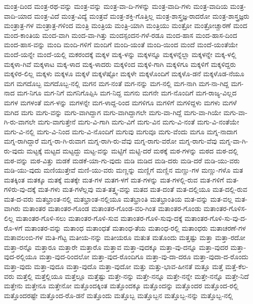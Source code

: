 {ಮಂತ್ರ-ದಿಂದ
ಮಂತ್ರ-ರಥ-ವನ್ನು
ಮಂತ್ರ-ವನ್ನು
ಮಂತ್ರ-ವಾ-ದಿ-ಗಳನ್ನು
ಮಂತ್ರ-ವಾದಿ-ಗಳು
ಮಂತ್ರ-ವಾದಿಯ
ಮಂತ್ರ-ವಾದಿ-ಯಾದ
ಮಂತ್ರ-ವಿದೆ
ಮಂತ್ರ-ವಿದ್ಯೆ
ಮಂತ್ರವೆ
ಮಂತ್ರ-ಶಕ್ತಿ-ಗೊತ್ತಿಲ್ಲ
ಮಂತ್ರ-ಶಾಸ್ತ್ರಜ್ಞ-ರಾದರೋ
ಮಂತ್ರ-ಶಾಸ್ತ್ರಜ್ಞರು
ಮಂತ್ರಾತ್ರ-ಗಳ
ಮಂತ್ರಾತ್ರ-ಗಳಿಂದ
ಮಂತ್ರಿ
ಮಂತ್ರಿಯ
ಮಂತ್ರಿ-ಯಾಗಿ
ಮಂತ್ರಿಯು
ಮಂತ್ರೋ
ಮಂತ್ರೋಚ್ಚಾರಣೆ
ಮಂದ
ಮಂದ-ಕಾಂತಿಯ
ಮಂದ-ವಾಗಿ
ಮಂದ-ವಾ-ಗಿತ್ತು
ಮಂದಸ್ಪಂದನ-ಗಳೆ-ರಡೂ
ಮಂದ-ಹಾಸ
ಮಂದ-ಹಾಸ-ದಿಂದ
ಮಂದ-ಹಾಸ-ವನ್ನು
ಮಂದಿ
ಮಂದಿ-ಗಳಿಗೆ
ಮಂದಿಗೆ
ಮಂದಿ-ಯಂತೆ
ಮಂದಿ-ಯಿಂದ
ಮಂದೆ
ಮಂದೆ-ಯಂತೆಯೇ
ಮಂದೆ-ಯನ್ನೇ
ಮಂದೆ-ಯಲ್ಲಿ
ಮಕರಂದಕ್ಕೆ
ಮಕ್ಕಳ
ಮಕ್ಕ-ಳನ್ನು
ಮಕ್ಕಳನ್ನೂ
ಮಕ್ಕಳನ್ನೆಲ್ಲಾ
ಮಕ್ಕಳನ್ನೇ
ಮಕ್ಕ-ಳಲ್ಲಿ
ಮಕ್ಕಳಾ-ಗಿವೆ
ಮಕ್ಕಳಾಟ
ಮಕ್ಕ-ಳಾದ
ಮಕ್ಕ-ಳಾದರು
ಮಕ್ಕಳಿಂದ
ಮಕ್ಕಳಿ-ಗಾಗಿ
ಮಕ್ಕಳಿಗೂ
ಮಕ್ಕಳಿಗೆ
ಮಕ್ಕಳಿದ್ದರು
ಮಕ್ಕಳಿರ-ಲಿಲ್ಲ
ಮಕ್ಕಳು
ಮಕ್ಕಳೂ
ಮಕ್ಕಳೆ
ಮಕ್ಕಳೆಷ್ಟೋ
ಮಕ್ಕಳೇ
ಮಕ್ಕಳೊಂದಿಗೆ
ಮಕ್ಕಳೊ-ಡನೆ
ಮಕ್ಕಳೊಡ-ನೆಯೂ
ಮಗ
ಮಗದೊಬ್ಬ
ಮಗದೊಬ್ಬ-ನಲ್ಲಿ
ಮಗನ
ಮಗ-ನಂತೆ
ಮಗ-ನನ್ನು
ಮಗ-ನಲ್ಲಿ
ಮಗ-ನಾಗಿ
ಮಗ-ನಾ-ಗಿದ್ದ
ಮಗ-ನಾದ
ಮಗ-ನಿಗೂ
ಮಗ-ನಿಗೆ
ಮಗನಿಗೊಪ್ಪಿಸಿ
ಮಗ-ನಿದ್ದ
ಮಗನು
ಮಗನೇ
ಮಗ-ನೊಂದಿಗೆ
ಮಗ-ರಾಜ್ಯ-ವಿಲ್ಲದ
ಮಗಳ
ಮಗಳಂತೆ
ಮಗ-ಳನ್ನು
ಮಗಳನ್ನೇ
ಮಗ-ಳಾದ್ದ-ರಿಂದ
ಮಗಳಿಗೂ
ಮಗಳಿಗೆ
ಮಗಳಿದ್ದಳು
ಮಗಳು
ಮಗಳೆ
ಮಗಿದ
ಮಗು
ಮಗು-ವನ್ನು
ಮಗು-ವಾಗಿದ್ದಾಗ
ಮಗು-ವಾಗಿದ್ದಾಗಲೇ
ಮಗು-ವಾ-ಗಿದ್ದೆ
ಮಗು-ವಾ-ಗಿಯೇ
ಮಗು-ವಾ-ಗಿ-ರು-ವಾಗಲೇ
ಮಗು-ವಾಗುತ್ತೇನೆ
ಮಗು-ವಿ-ಗಾಗಿ
ಮಗು-ವಿಗೆ
ಮಗು-ವಿನ
ಮಗು-ವಿ-ನಂತೆ
ಮಗು-ವಿ-ನಂತೆಯೇ
ಮಗು-ವಿ-ನಲ್ಲಿ
ಮಗು-ವಿ-ನಿಂದ
ಮಗು-ವಿ-ನೊಂದಿಗೆ
ಮಗುವು
ಮಗುವೂ
ಮಗು-ವೆಂದು
ಮಗೂ
ಮಗ್ನ-ನಾದಾಗ
ಮಗ್ನ-ರಾಗಿದ್ದಾರೆ
ಮಗ್ನ-ರಾ-ಗಿ-ರುವಾಗ
ಮಗ್ನ-ರಾಗಿ-ರು-ವೆವು
ಮಗ್ನ-ರಾಗು-ವರೋ
ಮಗ್ನ-ರಾಗು-ವೆವು
ಮಗ್ನ-ವಾ-ಗಿ-ರು-ವುದು
ಮಟ್ಟಕ್ಕೆ
ಮಟ್ಟದ
ಮಟ್ಟದ್ದು
ಮಟ್ಟ-ವನ್ನು
ಮಟ್ಟಿಗೆ
ಮಟ್ಟಿ-ದರೆ
ಮಠಕ್ಕೆ
ಮಠ-ಗಳನ್ನು
ಮಠದ
ಮಠ-ದಲ್ಲಿ
ಮಠ-ವನ್ನು
ಮಠ-ವಿತ್ತು
ಮಡಕೆ
ಮಡಕೆ-ಯಾ-ಗು-ವುದು
ಮಡಿ
ಮಡಿದ
ಮಡಿ-ದರು
ಮಡಿ-ದರೆ
ಮಡಿ-ಯು-ವರು
ಮಡಿ-ಯು-ವುದು
ಮಣಿಯುತ್ತೇವೆ
ಮಣಿ-ಯು-ವರು
ಮಣ್ಣನ್ನು
ಮಣ್ಣಿಗೆ
ಮಣ್ಣಿನ
ಮಣ್ಣು-ಗಳ
ಮಣ್ಣು-ಗಳೊ
ಮತ
ಮತಕ್ಕಿಂತ
ಮತಕ್ಕೂ
ಮತಕ್ಕೆ
ಮತಕ್ಕೇ
ಮತ-ಗಳ
ಮತಗ-ಳಗೆ
ಮತ-ಗಳನ್ನು
ಮತ-ಗಳಲ್ಲಿ-ರುವ
ಮತ-ಗಳಿಗೆ
ಮತ-ಗಳಿರು-ವು-ದಕ್ಕೆ
ಮತ-ಗಳು
ಮತ-ಗಳೆಲ್ಲವು
ಮತ-ತತ್ತ್ವ-ವನ್ನು
ಮತದ
ಮತ-ದಂತೆ
ಮತ-ದಲ್ಲಿಯೂ
ಮತ-ದಲ್ಲಿ-ರುವ
ಮತ-ದ-ವರು
ಮತಭ್ರಾಂತ-ನಲ್ಲಿ
ಮತಭ್ರಾಂತ-ನಲ್ಲಿಯೂ
ಮತಭ್ರಾಂತಿ
ಮತಭ್ರಾಂತಿಯ
ಮತ-ವನ್ನು
ಮತ-ವಲ್ಲ
ಮತ-ವಾಗಿರು
ಮತಾಂತರ
ಮತಾಂತರ-ಗೊಂಡ
ಮತಾಂತರ-ಗೊಂಡ-ವರಿ-ಗಿಂತ
ಮತಾಂತರ-ಗೊಂಡು
ಮತಾಂತರ-ಗೊಳಿಸ-ಲಿಲ್ಲ
ಮತಾಂತರ-ಗೊಳಿ-ಸಲು
ಮತಾಂತರ-ಗೊಳಿ-ಸುವ
ಮತಾಂತರ-ಗೊಳಿ-ಸುವು-ದಕ್ಕೆ
ಮತಾಂತರ-ಗೊಳಿ-ಸು-ವು-ದ-ರೊ-ಳಗೆ
ಮತಾಂತರ-ವನ್ನು
ಮತಾಂಧ
ಮತಾಂಧತೆ
ಮತಾಂಧ-ತೆಯ
ಮತಾಂಧ-ರಲ್ಲಿ
ಮತಾಂಧರು
ಮತಾಚರಣೆ-ಗಳ
ಮತಾವಲಂಬಿ-ಗಳ
ಮತಿ-ಗೆಟ್ಟ
ಮತೀಯ-ನನ್ನು
ಮತೀಯರೂ
ಮತುತ
ಮತೊಂದು
ಮತ್ತಷ್ಟು
ಮತ್ತಾ
ಮತ್ತಾ-ರದೋ
ಮತ್ತಾ-ರನ್ನೊ
ಮತ್ತಾರೂ
ಮತ್ತಾರೇ
ಮತ್ತಾರೊ
ಮತ್ತಾವ
ಮತ್ತಾ-ವುದಕ್ಕೂ
ಮತ್ತಾ-ವು-ದನ್ನೂ
ಮತ್ತಾ-ವುದರ
ಮತ್ತಾ-ವುದ-ರಲ್ಲಿಯೂ
ಮತ್ತಾ-ವುದ-ರಿಂದಲೋ
ಮತ್ತಾ-ವುದ-ರೊಂದಿಗೂ
ಮತ್ತಾ-ವು-ದಾ-ದರೂ
ಮತ್ತಾ-ವುದಾ-ದ-ರೊಂದು
ಮತ್ತಾ-ವುದು
ಮತ್ತಾ-ವುದೂ
ಮತ್ತಾ-ವುದೊ
ಮತ್ತಾ-ವುದೋ
ಮತ್ತು
ಮತ್ತು-ಭಾವ-ಹೀನತೆ
ಮತ್ತೂ
ಮತ್ತೆ
ಮತ್ತೆ-ಕೆಲ-ವರು
ಮತ್ತೆಲ್ಲಿ
ಮತ್ತೆಲ್ಲಿಯೂ
ಮತ್ತೆಲ್ಲೂ
ಮತ್ತೆಷ್ಟು
ಮತ್ತೇ-ನನ್ನು
ಮತ್ತೇ-ನನ್ನೂ
ಮತ್ತೇ-ನನ್ನೇ
ಮತ್ತೇ-ನನ್ನೊ
ಮತ್ತೇ-ನಿದೆ
ಮತ್ತೇನು
ಮತ್ತೇನೂ
ಮತ್ತೇನೋ
ಮತ್ತೊಂದಕ್ಕಿಂತ
ಮತ್ತೊಂದಕ್ಕೂ
ಮತ್ತೊಂದನ್ನು
ಮತ್ತೊಂದರ
ಮತ್ತೊಂದ-ರಲ್ಲಿ
ಮತ್ತೊಂದರಷ್ಟೇ
ಮತ್ತೊಂದ-ರೊ-ಡನೆ
ಮತ್ತೊಂದು
ಮತ್ತೊಬ್ಬ
ಮತ್ತೊಬ್ಬನ
ಮತ್ತೊಬ್ಬ-ನನ್ನು
ಮತ್ತೊಬ್ಬ-ನಲ್ಲಿ
}
